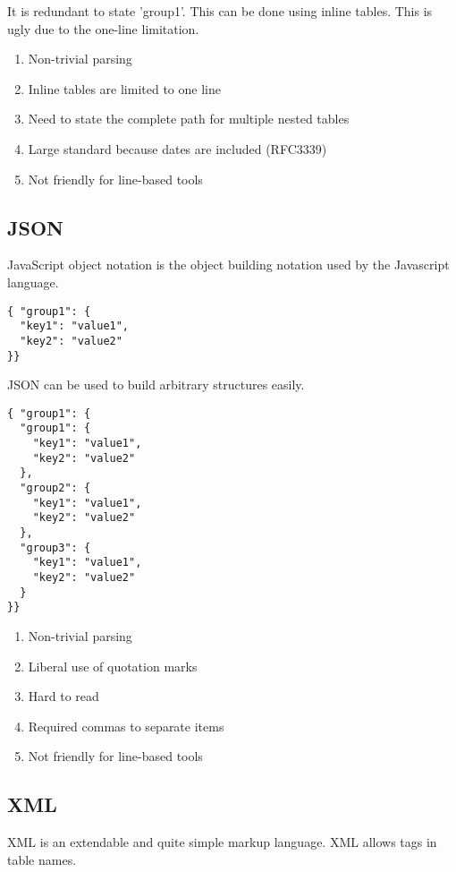 \documentclass[listof=totoc]{article}
\begin{document}
\noindent It is redundant to state 'group1'. This can be done using inline tables. This is ugly due to the one-line limitation.

\begin{enumerate}
  \item Non-trivial parsing
  \item Inline tables are limited to one line
  \item Need to state the complete path for multiple nested tables
  \item Large standard because dates are included (RFC3339)
  \item Not friendly for line-based tools
\end{enumerate}

\subsection{JSON}
\noindent JavaScript object notation is the object building notation used by the Javascript language.

\begin{verbatim}
{ "group1": {
  "key1": "value1",
  "key2": "value2"
}}
\end{verbatim}

\noindent JSON can be used to build arbitrary structures easily.

\begin{verbatim}
{ "group1": {
  "group1": {
    "key1": "value1",
    "key2": "value2"
  },
  "group2": {
    "key1": "value1",
    "key2": "value2"
  },
  "group3": {
    "key1": "value1",
    "key2": "value2"
  }
}}
\end{verbatim}

\begin{enumerate}
  \item Non-trivial parsing
  \item Liberal use of quotation marks
  \item Hard to read
  \item Required commas to separate items
  \item Not friendly for line-based tools
\end{enumerate}

\subsection{XML}
\noindent XML is an extendable and quite simple markup language. XML allows tags in table names.
\end{document}

